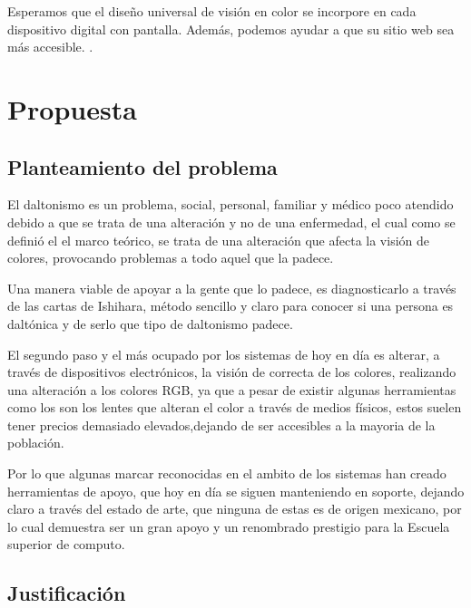\documentclass[10pt]{article}
\begin{document}
\setlength{\parskip}{2mm}

Esperamos que el diseño universal de visión en color se incorpore en cada dispositivo digital con pantalla. Además, podemos ayudar a que su sitio web sea más accesible.
\cite{IEEEreferencias:Ref20}.

\newpage
\section{Propuesta}

\subsection{Planteamiento del problema}

El daltonismo es un problema, social, personal, familiar y médico poco atendido debido a que se trata de una alteración y no de una enfermedad, el cual como se definió el el marco teórico, se trata de una alteración que afecta la visión de colores, provocando problemas a todo aquel que la padece.

\setlength{\parskip}{2mm}

Una manera viable de apoyar a la gente que lo padece, es diagnosticarlo a través de las cartas de Ishihara, método sencillo y claro para conocer si una persona es daltónica y de serlo que tipo de daltonismo padece.

\setlength{\parskip}{2mm}

El segundo paso y el más ocupado por los sistemas de hoy en día es alterar, a través de dispositivos electrónicos, la visión de correcta de los colores, realizando una alteración a los colores RGB, ya que a pesar de existir algunas herramientas como los son los lentes que alteran el color a través de medios físicos, estos suelen tener precios demasiado elevados,dejando de ser accesibles a la mayoria de la población.

Por lo que algunas marcar reconocidas en el ambito de los sistemas han creado herramientas de apoyo, que hoy en día se siguen manteniendo en soporte, dejando claro a través del estado de arte, que ninguna de estas es de origen mexicano, por lo cual demuestra ser un gran apoyo y un renombrado prestigio para la Escuela superior de computo.

\subsection{Justificación}
\end{document}
